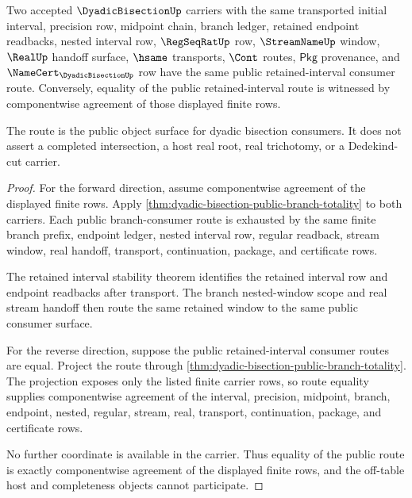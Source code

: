 \begin{theorem}
\label{thm:dyadic-bisection-retained-interval-consumer-route}
Two accepted $\DyadicBisectionUp$ carriers with the same transported initial
interval, precision row, midpoint chain, branch ledger, retained endpoint
readbacks, nested interval row, $\RegSeqRatUp$ row, $\StreamNameUp$ window,
$\RealUp$ handoff surface, $\hsame$ transports, $\Cont$ routes, $\mathsf{Pkg}$
provenance, and $\NameCert_{\DyadicBisectionUp}$ row have the same public
retained-interval consumer route. Conversely, equality of the public
retained-interval route is witnessed by componentwise agreement of those
displayed finite rows.

The route is the public object surface for dyadic bisection consumers. It does
not assert a completed intersection, a host real root, real trichotomy, or a
Dedekind-cut carrier.
\end{theorem}
\begin{proof}
For the forward direction, assume componentwise agreement of the displayed
finite rows. Apply
\autoref{thm:dyadic-bisection-public-branch-totality} to both carriers. Each
public branch-consumer route is exhausted by the same finite branch prefix,
endpoint ledger, nested interval row, regular readback, stream window, real
handoff, transport, continuation, package, and certificate rows.

The retained interval stability theorem identifies the retained interval row
and endpoint readbacks after transport. The branch nested-window scope and real
stream handoff then route the same retained window to the same public consumer
surface.

For the reverse direction, suppose the public retained-interval consumer routes
are equal. Project the route through
\autoref{thm:dyadic-bisection-public-branch-totality}. The projection exposes
only the listed finite carrier rows, so route equality supplies componentwise
agreement of the interval, precision, midpoint, branch, endpoint, nested,
regular, stream, real, transport, continuation, package, and certificate rows.

No further coordinate is available in the carrier. Thus equality of the public
route is exactly componentwise agreement of the displayed finite rows, and the
off-table host and completeness objects cannot participate.
\end{proof}

